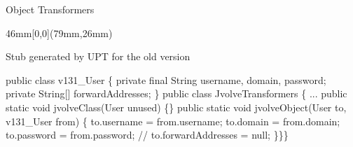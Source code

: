 \begin{frame}[fragile,shrink=5]{Object Transformers}%
 {
\begin{textblock*}{46mm}[0,0](79mm,26mm)
\begin{block}{}
Stub generated by UPT for the old version
\end{block}
\end{textblock*}
}
\begin{small}
\begin{semiverbatim}
public class v131_User \{
  private final String username, domain, password;
  private String[] forwardAddresses;
\}
public class JvolveTransformers \{
 ...
 public static void jvolveClass(User unused) \{\}
 public static void jvolveObject(User to, v131_User from) \{
    to.username = from.username;
    to.domain = from.domain;
    to.password = from.password;
    // to.forwardAddresses = null;
    \}\}\}

\end{semiverbatim}
\end{small}
\end{frame}
